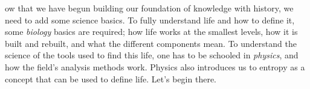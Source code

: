 ow that we have begun building our foundation of knowledge with history, we need to add some science basics.
To fully understand life and how to define it, some \emph{biology} basics are required; how life works at the smallest levels, how it is built and rebuilt, and what the different components mean.
To understand the science of the tools used to find this life, one has to be schooled in \emph{physics}, and how the field's analysis methods work.
Physics also introduces us to entropy as a concept that can be used to define life.
Let's begin there.